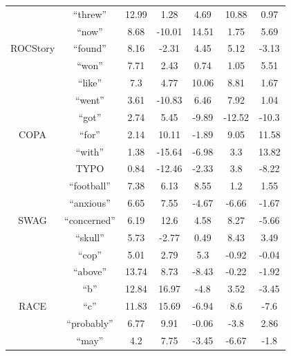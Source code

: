 \begin{table}[th]
\begin{tabular}{c|c|c|c|c|c|c}
	   \hline 
\multirow{5}{*}{ROCStory} 
& ``threw'' & 12.99 & 1.28 &4.69 & 10.88& 0.97 \\                                                                      
& ``now'' & 8.68 & -10.01 &14.51 & 1.75& 5.69 \\
& ``found'' & 8.16 & -2.31 &4.45 & 5.12& -3.13 \\
& ``won'' & 7.71 & 2.43 &0.74 & 1.05& 5.51 \\
& ``like'' & 7.3 & 4.77 &10.06 & 8.81& 1.67 \\
	   \hline 
\multirow{5}{*}{COPA} 
& ``went'' & 3.61 & -10.83 &6.46 & 7.92& 1.04 \\                                                                       
& ``got'' & 2.74 & 5.45 &-9.89 & -12.52& -10.3 \\
& ``for'' & 2.14 & 10.11 &-1.89 & 9.05& 11.58 \\
& ``with'' & 1.38 & -15.64 &-6.98 & 3.3& 13.82 \\
& TYPO & 0.84 & -12.46 &-2.33 & 3.8& -8.22 \\
	    \hline 
\multirow{5}{*}{SWAG}
& ``football'' & 7.38 & 6.13 &8.55 & 1.2& 1.55 \\
& ``anxious'' & 6.65 & 7.55 &-4.67 & -6.66& -1.67 \\
& ``concerned'' & 6.19 & 12.6 &4.58 & 8.27& -5.66 \\
& ``skull'' & 5.73 & -2.77 &0.49 & 8.43& 3.49 \\
& ``cop'' & 5.01 & 2.79 &5.3 & -0.92& -0.04 \\
\hline 

\multirow{5}{*}{RACE} 
& ``above'' & 13.74 & 8.73 &-8.43 & -0.22& -1.92 \\                                                                    
& ``b'' & 12.84 & 16.97 &-4.8 & 3.52& -3.45 \\
& ``c'' & 11.83 & 15.69 &-6.94 & 8.6& -7.6 \\
& ``probably'' & 6.77 & 9.91 &-0.06 & -3.8& 2.86 \\
& ``may'' & 4.2 & 7.75 &-3.45 & -6.67& -1.8 \\
	   

\end{tabular}
\end{table}
